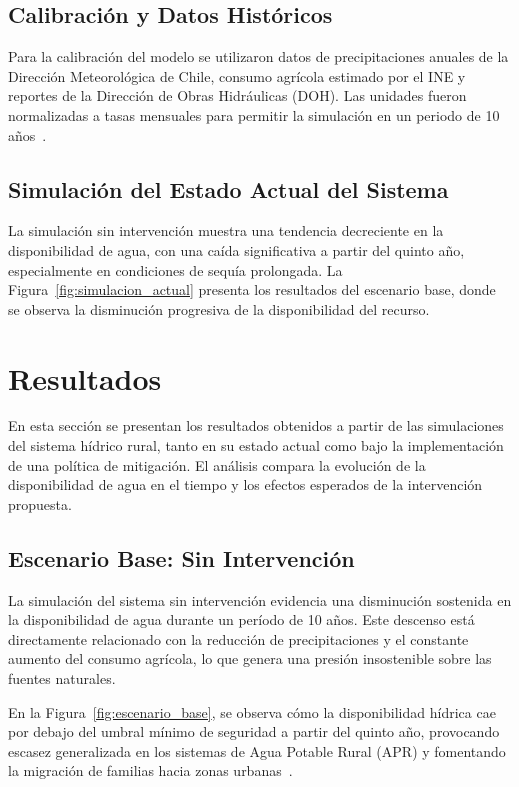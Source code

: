 \documentclass[10pt]{article}
\begin{document}
\subsection{Calibración y Datos Históricos}
Para la calibración del modelo se utilizaron datos de precipitaciones anuales de la Dirección Meteorológica de Chile, consumo agrícola estimado por el INE y reportes de la Dirección de Obras Hidráulicas (DOH). Las unidades fueron normalizadas a tasas mensuales para permitir la simulación en un periodo de 10 años~\parencite{mop2019,dgapublic2023}.
\subsection{Simulación del Estado Actual del Sistema}
La simulación sin intervención muestra una tendencia decreciente en la disponibilidad de agua, con una caída significativa a partir del quinto año, especialmente en condiciones de sequía prolongada. La Figura~\ref{fig:simulacion_actual} presenta los resultados del escenario base, donde se observa la disminución progresiva de la disponibilidad del recurso.

\section{Resultados}

En esta sección se presentan los resultados obtenidos a partir de las simulaciones del sistema hídrico rural, tanto en su estado actual como bajo la implementación de una política de mitigación. El análisis compara la evolución de la disponibilidad de agua en el tiempo y los efectos esperados de la intervención propuesta.

\subsection{Escenario Base: Sin Intervención}

La simulación del sistema sin intervención evidencia una disminución sostenida en la disponibilidad de agua durante un período de 10 años. Este descenso está directamente relacionado con la reducción de precipitaciones y el constante aumento del consumo agrícola, lo que genera una presión insostenible sobre las fuentes naturales.

En la Figura~\ref{fig:escenario_base}, se observa cómo la disponibilidad hídrica cae por debajo del umbral mínimo de seguridad a partir del quinto año, provocando escasez generalizada en los sistemas de Agua Potable Rural (APR) y fomentando la migración de familias hacia zonas urbanas~\parencite{dgapublic2023}.
\end{document}
